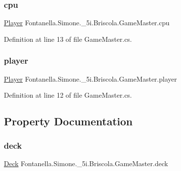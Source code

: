 \subsubsection{\texorpdfstring{cpu}{cpu}}
{\footnotesize\ttfamily \hyperlink{class_fontanella_1_1_simone_1_1__5i_1_1_briscola_1_1_player}{Player} Fontanella.\+Simone.\+\_\+5i.\+Briscola.\+Game\+Master.\+cpu}



Definition at line 13 of file Game\+Master.\+cs.

\hypertarget{class_fontanella_1_1_simone_1_1__5i_1_1_briscola_1_1_game_master_ad26dcfbe972933f69347ff5219b9c668}{}\label{class_fontanella_1_1_simone_1_1__5i_1_1_briscola_1_1_game_master_ad26dcfbe972933f69347ff5219b9c668} 
\subsubsection{\texorpdfstring{player}{player}}
{\footnotesize\ttfamily \hyperlink{class_fontanella_1_1_simone_1_1__5i_1_1_briscola_1_1_player}{Player} Fontanella.\+Simone.\+\_\+5i.\+Briscola.\+Game\+Master.\+player}



Definition at line 12 of file Game\+Master.\+cs.



\subsection{Property Documentation}
\hypertarget{class_fontanella_1_1_simone_1_1__5i_1_1_briscola_1_1_game_master_a20b2b972a62fd9a96cc40c1540732550}{}\label{class_fontanella_1_1_simone_1_1__5i_1_1_briscola_1_1_game_master_a20b2b972a62fd9a96cc40c1540732550} 
\subsubsection{\texorpdfstring{deck}{deck}}
{\footnotesize\ttfamily \hyperlink{class_fontanella_1_1_simone_1_1__5i_1_1_briscola_1_1_deck}{Deck} Fontanella.\+Simone.\+\_\+5i.\+Briscola.\+Game\+Master.\+deck\hspace{0.3cm}{\ttfamily [get]}}



